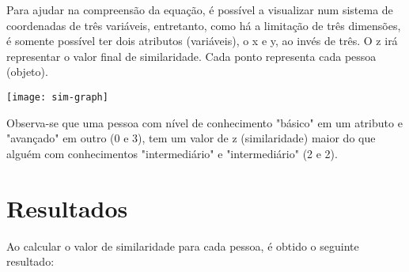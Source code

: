 \documentclass[]{article}
\begin{document}
 	Para ajudar na compreensão da equação, é possível a visualizar num sistema de coordenadas de três variáveis, entretanto, como há a limitação de três dimensões, é somente possível ter dois atributos (variáveis), o x e y, ao invés de três. O z irá representar o valor final de similaridade. Cada ponto representa cada pessoa (objeto).
 	

	\texttt{[image: sim-graph]}
	
	
	Observa-se que uma pessoa com nível de conhecimento "básico" em um atributo e "avançado" em outro (0 e 3), tem um valor de z (similaridade) maior do que alguém com conhecimentos "intermediário" e "intermediário" (2 e 2).

	\section{Resultados}
		Ao calcular o valor de similaridade para cada pessoa, é obtido o seguinte resultado:
		
\end{document}
